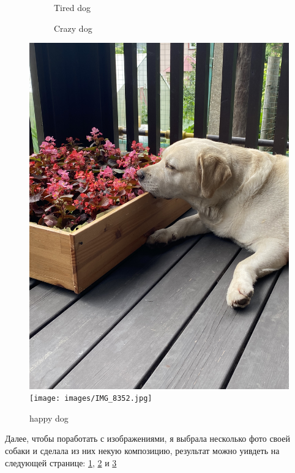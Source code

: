 \documentclass[10pt,a4paper]{report}
\begin{document}
\begin{figure}[t]
    \centering
    \begin{subfigure}{0.8\textwidth}
    \caption{Tired dog}
    \label{fig1}
    \end{subfigure}
    \begin{subfigure}{1\textwidth}
    \caption{Crazy dog}
    \label{fig2}
    \end{subfigure}
    \includegraphics[height=0.6\textwidth]{images/IMG_8476.jpg}
    \texttt{[image: images/IMG\_8352.jpg]}
    \caption{happy dog}
    \label{fig3}
\end{figure}
\Large
Далее, чтобы поработать с изображениями, я выбрала  несколько фото своей собаки и сделала из них некую композицию, результат можно уивдеть на следующей странице: \ref{fig1}, \ref{fig2} и \ref{fig3}
\normalsize
\end{document}
